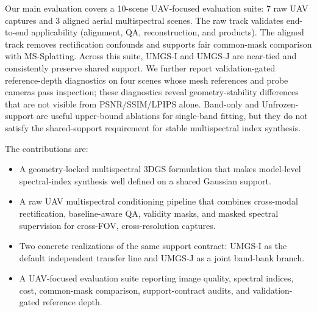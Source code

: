 Our main evaluation covers a 10-scene UAV-focused evaluation suite: 7 raw UAV captures and 3 aligned aerial multispectral scenes. The raw track validates end-to-end applicability (alignment, QA, reconstruction, and products). The aligned track removes rectification confounds and supports fair common-mask comparison with MS-Splatting. Across this suite, UMGS-I and UMGS-J are near-tied and consistently preserve shared support. We further report validation-gated reference-depth diagnostics on four scenes whose mesh references and probe cameras pass inspection; these diagnostics reveal geometry-stability differences that are not visible from PSNR/SSIM/LPIPS alone. Band-only and Unfrozen-support are useful upper-bound ablations for single-band fitting, but they do not satisfy the shared-support requirement for stable multispectral index synthesis.

The contributions are:
\begin{itemize}
    \item A geometry-locked multispectral 3DGS formulation that makes model-level spectral-index synthesis well defined on a shared Gaussian support.
    \item A raw UAV multispectral conditioning pipeline that combines cross-modal rectification, baseline-aware QA, validity masks, and masked spectral supervision for cross-FOV, cross-resolution captures.
    \item Two concrete realizations of the same support contract: UMGS-I as the default independent transfer line and UMGS-J as a joint band-bank branch.
    \item A UAV-focused evaluation suite reporting image quality, spectral indices, cost, common-mask comparison, support-contract audits, and validation-gated reference depth.
\end{itemize}
